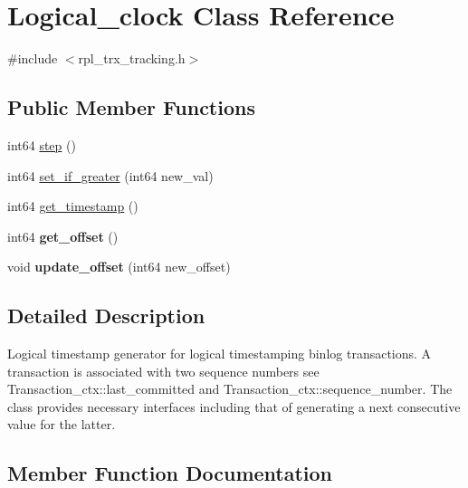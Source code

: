 \hypertarget{classLogical__clock}{}\section{Logical\+\_\+clock Class Reference}
\label{classLogical__clock}


{\ttfamily \#include $<$rpl\+\_\+trx\+\_\+tracking.\+h$>$}

\subsection*{Public Member Functions}
\begin{DoxyCompactItemize}
\item 
int64 \mbox{\hyperlink{classLogical__clock_a1d2e019f74f509ac6244cd4a6e3f1101}{step}} ()
\item 
int64 \mbox{\hyperlink{classLogical__clock_a245c0427e7eda455da53e26c4b8a0bf9}{set\+\_\+if\+\_\+greater}} (int64 new\+\_\+val)
\item 
int64 \mbox{\hyperlink{classLogical__clock_ac686c90f57dbf876a7a87d648ef35700}{get\+\_\+timestamp}} ()
\item 
\mbox{\label{classLogical__clock_afc18ca694cbab72dbe865485d5632b9c}} 
int64 {\bfseries get\+\_\+offset} ()
\item 
\mbox{\label{classLogical__clock_a4cf04e43d7f6d5a39fb58c3610408774}} 
void {\bfseries update\+\_\+offset} (int64 new\+\_\+offset)
\end{DoxyCompactItemize}


\subsection{Detailed Description}
Logical timestamp generator for logical timestamping binlog transactions. A transaction is associated with two sequence numbers see {\ttfamily Transaction\+\_\+ctx\+::last\+\_\+committed} and {\ttfamily Transaction\+\_\+ctx\+::sequence\+\_\+number}. The class provides necessary interfaces including that of generating a next consecutive value for the latter. 

\subsection{Member Function Documentation}
\mbox{\label{classLogical__clock_ac686c90f57dbf876a7a87d648ef35700}} 
